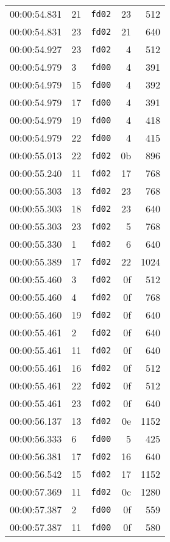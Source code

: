 \documentclass{article}
\begin{document}
\begin{longtable}{lllrr}
00:00:54.831 & 21 & \texttt{fd02} & 23 & 512 \\
00:00:54.831 & 23 & \texttt{fd02} & 21 & 640 \\
00:00:54.927 & 23 & \texttt{fd02} & 4 & 512 \\
00:00:54.979 & 3 & \texttt{fd00} & 4 & 391 \\
00:00:54.979 & 15 & \texttt{fd00} & 4 & 392 \\
00:00:54.979 & 17 & \texttt{fd00} & 4 & 391 \\
00:00:54.979 & 19 & \texttt{fd00} & 4 & 418 \\
00:00:54.979 & 22 & \texttt{fd00} & 4 & 415 \\
00:00:55.013 & 22 & \texttt{fd02} & 0b & 896 \\
00:00:55.240 & 11 & \texttt{fd02} & 17 & 768 \\
00:00:55.303 & 13 & \texttt{fd02} & 23 & 768 \\
00:00:55.303 & 18 & \texttt{fd02} & 23 & 640 \\
00:00:55.303 & 23 & \texttt{fd02} & 5 & 768 \\
00:00:55.330 & 1 & \texttt{fd02} & 6 & 640 \\
00:00:55.389 & 17 & \texttt{fd02} & 22 & 1024 \\
00:00:55.460 & 3 & \texttt{fd02} & 0f & 512 \\
00:00:55.460 & 4 & \texttt{fd02} & 0f & 768 \\
00:00:55.460 & 19 & \texttt{fd02} & 0f & 640 \\
00:00:55.461 & 2 & \texttt{fd02} & 0f & 640 \\
00:00:55.461 & 11 & \texttt{fd02} & 0f & 640 \\
00:00:55.461 & 16 & \texttt{fd02} & 0f & 512 \\
00:00:55.461 & 22 & \texttt{fd02} & 0f & 512 \\
00:00:55.461 & 23 & \texttt{fd02} & 0f & 640 \\
00:00:56.137 & 13 & \texttt{fd02} & 0e & 1152 \\
00:00:56.333 & 6 & \texttt{fd00} & 5 & 425 \\
00:00:56.381 & 17 & \texttt{fd02} & 16 & 640 \\
00:00:56.542 & 15 & \texttt{fd02} & 17 & 1152 \\
00:00:57.369 & 11 & \texttt{fd02} & 0c & 1280 \\
00:00:57.387 & 2 & \texttt{fd00} & 0f & 559 \\
00:00:57.387 & 11 & \texttt{fd00} & 0f & 580 \\

\end{longtable}
\end{document}
